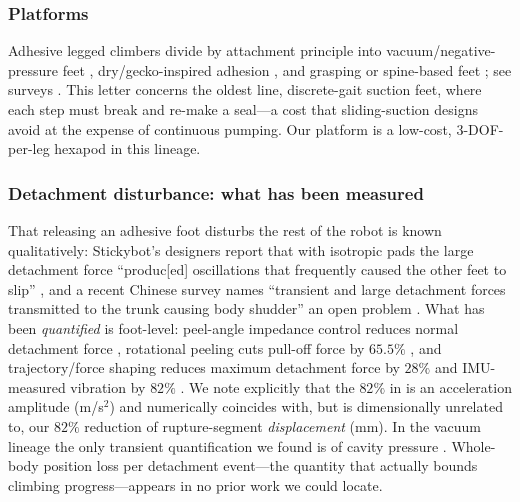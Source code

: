 \documentclass[journal]{IEEEtran}
\begin{document}
\subsubsection{Platforms} Adhesive legged climbers divide by attachment
principle into vacuum/negative-pressure feet
\cite{hirose1991ninja,zhang2006sky,guan2013wclimbot,li2025biped},
dry/gecko-inspired adhesion \cite{unver2006geckobot,kim2008smooth,
henrey2014abigaille}, and grasping or spine-based feet
\cite{parness2017lemur,nadan2024loris}; see surveys
\cite{nansai2016survey,tao2023climbing}. This letter concerns the
oldest line, discrete-gait suction feet, where each step must break and
re-make a seal---a cost that sliding-suction designs
\cite{longo2004alicia,yue2024snail} avoid at the expense of continuous
pumping. Our platform is a low-cost, 3-DOF-per-leg hexapod in
this lineage.

\subsubsection{Detachment disturbance: what has been measured} That
releasing an adhesive foot disturbs the rest of the robot is known
qualitatively: Stickybot's designers report that with isotropic pads the
large detachment force ``produc[ed] oscillations that frequently caused
the other feet to slip'' \cite{kim2008smooth}, and a recent Chinese
survey names ``transient and large detachment forces transmitted to the
trunk causing body shudder'' an open problem \cite{pei2023review}. What
has been \emph{quantified} is foot-level: peel-angle impedance control
reduces normal detachment force \cite{wang2021compliant}, rotational
peeling cuts pull-off force by $65.5\%$ \cite{wen2025force}, and
trajectory/force shaping reduces maximum detachment force by $28\%$ and
IMU-measured vibration by $82\%$ \cite{xiao2025ftfof}. We note explicitly
that the $82\%$ in \cite{xiao2025ftfof} is an acceleration amplitude
(m/s$^2$) and numerically coincides with, but is dimensionally unrelated
to, our $82\%$ reduction of rupture-segment \emph{displacement} (mm). In
the vacuum lineage the only transient quantification we found is of
cavity pressure \cite{pan2005suction}. Whole-body position loss per
detachment event---the quantity that actually bounds climbing
progress---appears in no prior work we could locate.
\end{document}
